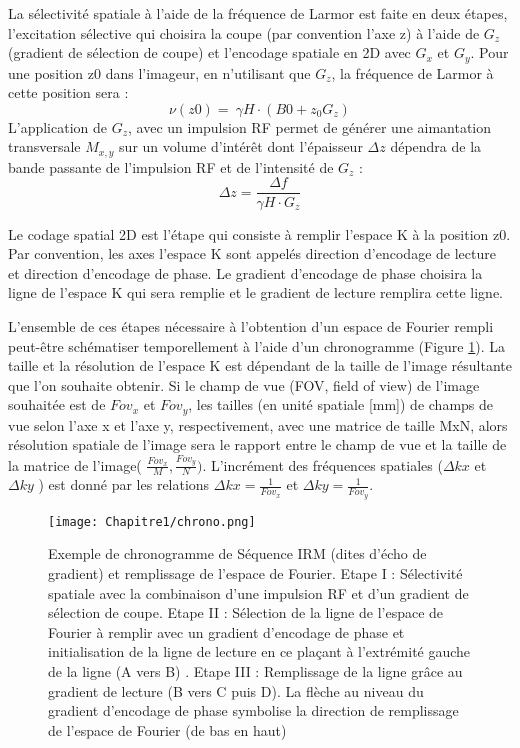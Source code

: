 La sélectivité spatiale à l’aide de la fréquence de Larmor est faite en deux étapes, l’excitation sélective qui choisira la coupe (par convention l’axe z) à l’aide de $G_z$ (gradient de sélection de coupe) et l’encodage spatiale en 2D avec $G_x$ et $G_y$.
Pour une position z0 dans l’imageur, en n’utilisant que $G_z$, la fréquence de Larmor à cette position sera :
\begin{equation}
\nonumber
\nu\left(z0\right)=\ \gamma H\cdot\left(B0+z_0G_z\right)
\end{equation}
L’application de $G_z$, avec un impulsion RF permet de générer une aimantation transversale $M_{x,y}$ sur un volume d’intérêt dont l’épaisseur $\Delta z$ dépendra de la bande passante de l’impulsion RF et de l’intensité de $G_z$ :
\begin{equation}
\nonumber
\Delta z=\frac{\Delta f}{\gamma H \cdot G_z}
\end{equation}

Le codage spatial 2D est l’étape qui consiste à remplir l’espace K à la position z0.  Par convention, les axes l’espace K sont appelés direction d’encodage de lecture et direction d’encodage de phase. Le gradient d’encodage de phase choisira la ligne de l’espace K qui sera remplie et le gradient de lecture remplira cette ligne.

L’ensemble de ces étapes nécessaire à l’obtention d’un espace de Fourier rempli peut-être schématiser temporellement à l’aide d’un chronogramme (Figure \ref{fig:chrono}). La taille et la résolution de l’espace K est dépendant de la taille de l’image résultante que l’on souhaite obtenir.  Si le champ de vue (FOV, field of view) de l’image souhaitée est de $Fov_x$ et $Fov_y$,  les tailles (en unité spatiale [mm])  de champs de vue selon l’axe x et l’axe y, respectivement, avec une matrice de taille MxN, alors résolution spatiale de l’image sera le rapport entre le champ de vue et la taille de la matrice de l’image( $\frac{{Fov}_x}{M},\frac{{Fov}_y}{N} )$. L’incrément des fréquences spatiales ($\Delta kx$ et $\Delta ky$ ) est donné par les relations $\Delta kx= \frac{1}{{Fov}_x}$ et $\Delta ky= \frac{1}{{Fov}_y}$.

\begin{figure}[!htbp]
  \begin{center}
    \texttt{[image: Chapitre1/chrono.png]}
     \end{center}
    \caption{Exemple de chronogramme de Séquence IRM (dites d'écho de gradient) et remplissage de l'espace de Fourier. Etape I : Sélectivité spatiale avec la combinaison d’une impulsion RF et d’un gradient de sélection de coupe. Etape II : Sélection de la ligne de l’espace de Fourier à remplir avec un gradient d’encodage de phase et initialisation de la ligne de lecture en ce plaçant à l’extrémité gauche de la ligne (A vers B) . Etape III : Remplissage de la ligne grâce au gradient de lecture (B vers C puis D). La flèche au niveau du gradient d’encodage de phase symbolise la direction de remplissage de l’espace de Fourier (de bas en haut)}
  \label{fig:chrono}
\end{figure}

